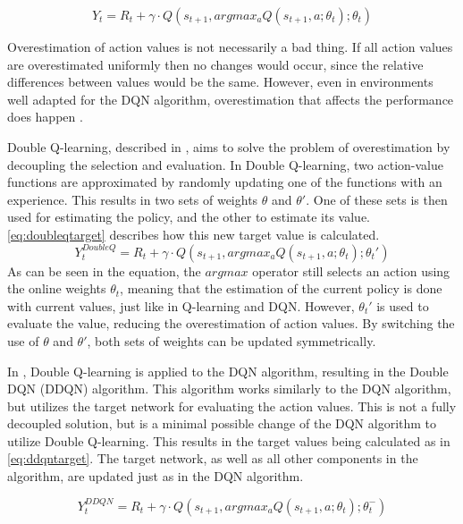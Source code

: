 \documentclass{kththesis}
\begin{document}
\begin{equation}
\label{eq:qtargetuntangled}
Y_t = R_t + \gamma \cdot Q(s_{t+1}, argmax_aQ(s_{t+1}, a;\theta_t);\theta_t)
\end{equation}

Overestimation of action values is not necessarily a bad thing. If all action values are overestimated uniformly then no changes would occur, since the relative differences between values would be the same. However, even in environments well adapted for the DQN algorithm, overestimation that affects the performance does happen \parencite{van2016deep}.

Double Q-learning, described in \textcite{hasselt2010double}, aims to solve the problem of overestimation by decoupling the selection and evaluation. In Double Q-learning, two action-value functions are approximated by randomly updating one of the functions with an experience. This results in two sets of weights $\theta$ and $\theta'$. One of these sets is then used for estimating the policy, and the other to estimate its value. \autoref{eq:doubleqtarget} describes how this new target value is calculated.
\begin{equation}
\label{eq:doubleqtarget}
Y_t^{DoubleQ} = R_t + \gamma \cdot Q(s_{t+1}, argmax_aQ(s_{t+1}, a;\theta_t);\theta_t')
\end{equation}
As can be seen in the equation, the $argmax$ operator still selects an action using the online weights $\theta_t$, meaning that the estimation of the current policy is done with current values, just like in Q-learning and DQN. However, $\theta_t'$ is used to evaluate the value, reducing the overestimation of action values. By switching the use of $\theta$ and $\theta'$, both sets of weights can be updated symmetrically. \parencite{van2016deep}

In \textcite{van2016deep}, Double Q-learning is applied to the DQN algorithm, resulting in the Double DQN (DDQN) algorithm. This algorithm works similarly to the DQN algorithm, but utilizes the target network for evaluating the action values. This is not a fully decoupled solution, but is a minimal possible change of the DQN algorithm to utilize Double Q-learning. This results in the target values being calculated as in \autoref{eq:ddqntarget}. The target network, as well as all other components in the algorithm, are updated just as in the DQN algorithm.

\begin{equation}
\label{eq:ddqntarget}
Y_t^{DDQN} = R_t + \gamma \cdot Q(s_{t+1}, argmax_aQ(s_{t+1}, a;\theta_t);\theta_t^-)
\end{equation}
\end{document}
